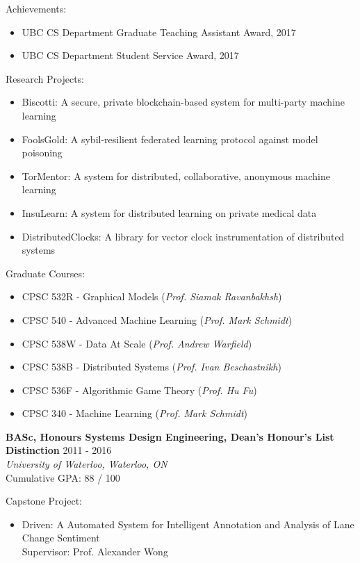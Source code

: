 \documentclass[10pt]{res} %
\begin{document}
Achievements:
\begin{itemize} 
    \item UBC CS Department Graduate Teaching Assistant Award, 2017
    \item UBC CS Department Student Service Award, 2017
\end{itemize}

Research Projects:
\begin{itemize}   
    \item Biscotti: A secure, private blockchain-based system for multi-party machine learning
    \item FoolsGold: A sybil-resilient federated learning protocol against 
    model poisoning 
    \item TorMentor: A system for distributed, collaborative, anonymous
    machine learning
    \item InsuLearn: A system for distributed learning on private
    medical data
    \item DistributedClocks: A library for vector clock instrumentation
    of distributed systems
\end{itemize}

Graduate Courses:
\begin{itemize} 
    \item CPSC 532R - Graphical Models (\emph{Prof. Siamak Ravanbakhsh})
    \item CPSC 540 - Advanced Machine Learning (\emph{Prof. Mark
    Schmidt})
    \item CPSC 538W - Data At Scale (\emph{Prof. Andrew Warfield})
    \item CPSC 538B - Distributed Systems (\emph{Prof. Ivan
    Beschastnikh})
    \item CPSC 536F - Algorithmic Game Theory (\emph{Prof. Hu Fu})
    \item CPSC 340 - Machine Learning (\emph{Prof. Mark Schmidt})
\end{itemize}


\textbf {BASc, Honours Systems Design Engineering, Dean's Honour's List Distinction} \hfill 2011 - 2016 \\ 
{\sl University of Waterloo, Waterloo, ON} \\
Cumulative GPA: 88 / 100

Capstone Project:
\begin{itemize}   
    \item Driven: A Automated System for Intelligent Annotation and Analysis of Lane Change Sentiment\\
    Supervisor: Prof. Alexander Wong
\end{itemize}
\end{document}
